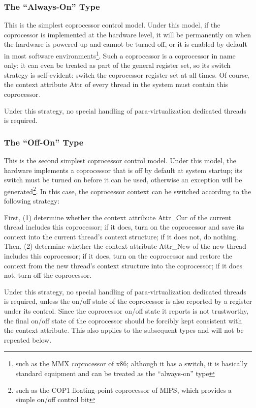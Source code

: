 \subsubsection{The ``Always-On'' Type}\label{subsubsec:9-coproc-always-on}

This is the simplest coprocessor control model. Under this model, if the coprocessor is implemented at the hardware level, it will be permanently on when the hardware is powered up and cannot be turned off, or it is enabled by default in most software environments\footnote{such as the MMX coprocessor of x86; although it has a switch, it is basically standard equipment and can be treated as the ``always-on'' type}. Such a coprocessor is a coprocessor in name only; it can even be treated as part of the general register set, so its switch strategy is self-evident: switch the coprocessor register set at all times. Of course, the context attribute Attr of every thread in the system must contain this coprocessor.

Under this strategy, no special handling of para-virtualization dedicated threads is required.

\subsubsection{The ``Off-On'' Type}\label{subsubsec:9-coproc-on-off}

This is the second simplest coprocessor control model. Under this model, the hardware implements a coprocessor that is off by default at system startup; its switch must be turned on before it can be used, otherwise an exception will be generated\footnote{such as the COP1 floating-point coprocessor of MIPS, which provides a simple on/off control bit}. In this case, the coprocessor context can be switched according to the following strategy:

First, (1) determine whether the context attribute Attr\_Cur of the current thread includes this coprocessor; if it does, turn on the coprocessor and save its context into the current thread's context structure; if it does not, do nothing. Then, (2) determine whether the context attribute Attr\_New of the new thread includes this coprocessor; if it does, turn on the coprocessor and restore the context from the new thread's context structure into the coprocessor; if it does not, turn off the coprocessor.

Under this strategy, no special handling of para-virtualization dedicated threads is required, unless the on/off state of the coprocessor is also reported by a register under its control. Since the coprocessor on/off state it reports is not trustworthy, the final on/off state of the coprocessor should be forcibly kept consistent with the context attribute. This also applies to the subsequent types and will not be repeated below.


